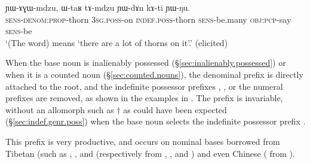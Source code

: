 \begin{exe}
\ex \label{ex:YAGWmdzu.def}
\gll ɲɯ-ɤɣɯ-mdzu, ɯ-taʁ tɤ-mdzu ɲɯ-dɤn kɤ-ti ɲɯ-ŋu. \\
\textsc{sens}-\textsc{denom}:\textsc{prop}-thorn \textsc{3sg}.\textsc{poss}-on \textsc{indef}.\textsc{poss}-thorn \textsc{sens}-be.many \textsc{obj}:\textsc{pcp}-say \textsc{sens}-be  \\
\glt `(The word)  means `there are a lot of thorns on it'.' (elicited)
\end{exe}

When the base noun is inalienably possessed (§\ref{sec:inalienably.possessed}) or when it is a counted noun (§\ref{sec:counted.nouns}), the denominal prefix is directly attached to the root, and the indefinite possessor prefixes , ,  or the numeral prefixes are removed, as shown in the examples in .  The  prefix is invariable, without an allomorph such as $\dagger$ as could have been expected (§\ref{sec:indef.genr.poss}) when the base noun selects the indefinite possessor prefix  .

This prefix is very productive, and occurs on nominal bases borrowed from Tibetan (such as , ,  and  (respectively from , ,  and  ) and even Chinese (	from ).

